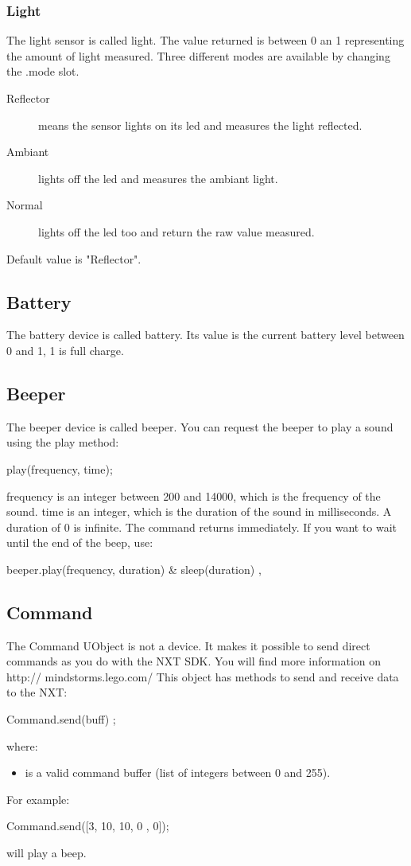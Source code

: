\subsubsection{Light}
The light sensor is called light.
The value returned is between 0 an 1 representing the amount of light measured.
Three different modes are available by changing the .mode slot.
\begin{description}
\item[Reflector] means the sensor lights on its led and measures the light
  reflected.
\item[Ambiant] lights off the led and measures the ambiant light.
\item[Normal] lights off the led too and return the raw value measured.
\end{description}
Default value is "Reflector".

\subsection{Battery}
The battery device is called battery.
Its value is the current battery level between 0 and 1, 1 is full charge.
\subsection{Beeper}
The beeper device is called beeper.
You can request the beeper to play a sound using the play method:
\begin{urbiunchecked}
  play(frequency, time);
\end{urbiunchecked}

frequency is an integer between 200 and 14000, which is the frequency of the
sound. time is an integer, which is the duration of the sound in milliseconds.
A duration of 0 is infinite.
The command returns immediately. If you want to wait until the end of the beep,
use:
\begin{urbiunchecked}
  { beeper.play(frequency, duration) & sleep(duration) },
\end{urbiunchecked}

\subsection{Command}
The Command UObject is not a device. It makes it possible to send direct
commands as you do with the NXT SDK. You will find more information on http://
mindstorms.lego.com/
This object has methods to send and receive data to the NXT:
\begin{urbiunchecked}
  Command.send(buff) ;
\end{urbiunchecked}
where:
\begin{itemize}
\item {} is a valid command buffer (list of integers between 0 and
  255).
\end{itemize}
For example:
\begin{urbiunchecked}
Command.send([3, 10, 10, 0 , 0]);
\end{urbiunchecked}
will play a beep.


